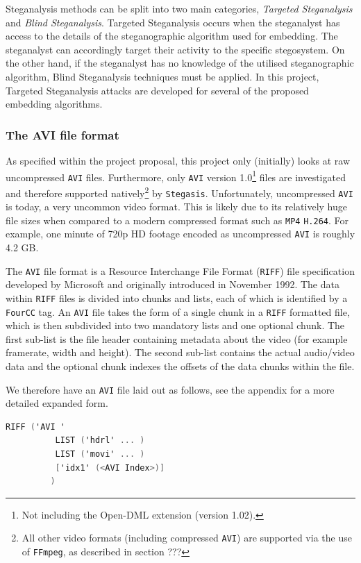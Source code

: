 \documentclass[paper=a4, fontsize=11pt,twoside]{scrartcl}    %
\numberwithin{table}{section}
\numberwithin{figure}{section}
\begin{document}
Steganalysis methods can be split into two main categories, \textit{Targeted Steganalysis} and \textit{Blind Steganalysis}. Targeted Steganalysis occurs when the steganalyst has access to the details of the steganographic algorithm used for embedding. The steganalyst can accordingly target their activity to the specific stegosystem. On the other hand, if the steganalyst has no knowledge of the utilised steganographic algorithm, Blind Steganalysis techniques must be applied. In this project, Targeted Steganalysis attacks are developed for several of the proposed embedding algorithms.

\subsubsection{The AVI file format}
\label{avi}
As specified within the project proposal, this project only (initially) looks at raw uncompressed \texttt{AVI} files. Furthermore, only \texttt{AVI} version 1.0\footnote{Not including the Open-DML extension (version 1.02).} files are investigated and therefore supported natively\footnote{All other video formats (including compressed \texttt{AVI}) are supported via the use of \texttt{FFmpeg}, as described in section ???} by \texttt{Stegasis}. Unfortunately, uncompressed \texttt{AVI} is today, a very uncommon video format. This is likely due to its relatively huge file sizes when compared to a modern compressed format such as \texttt{MP4} \texttt{H.264}. For example, one minute of 720p HD footage encoded as uncompressed \texttt{AVI} is roughly 4.2 GB.

The \texttt{AVI} file format is a Resource Interchange File Format (\texttt{RIFF}) file specification developed by Microsoft and originally introduced in November 1992. The data within \texttt{RIFF} files is divided into chunks and lists, each of which is identified by a \texttt{FourCC} tag. An \texttt{AVI} file takes the form of a single chunk in a \texttt{RIFF} formatted file, which is then subdivided into two mandatory lists and one optional chunk. The first sub-list is the file header containing metadata about the video (for example framerate, width and height). The second sub-list contains the actual audio/video data and the optional chunk indexes the offsets of the data chunks within the file.

We therefore have an \texttt{AVI} file laid out as follows, see the appendix for a more detailed expanded form.
\begin{lstlisting}[language=C, caption={\texttt{AVI RIFF} form}, frame=single, upquote=true]
	RIFF ('AVI '
	      LIST ('hdrl' ... )
	      LIST ('movi' ... )
 	      ['idx1' (<AVI Index>)]
	     )
\end{lstlisting}
\end{document}
